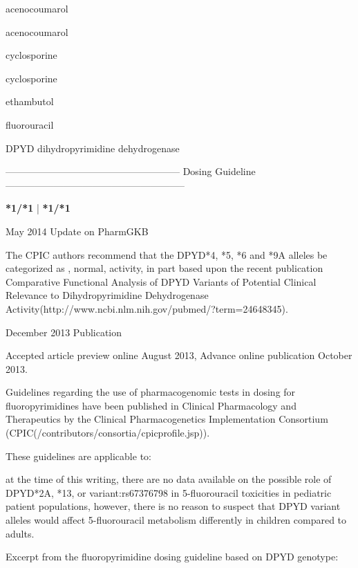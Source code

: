 \documentclass{resume} %
\begin{document}
\begin{rSection}{ acenocoumarol }
\begin{rSection}{ acenocoumarol }
\begin{rSection}{ cyclosporine }
\begin{rSection}{ cyclosporine }
\begin{rSection}{ ethambutol }
\end{rSection}\begin{rSection}{ fluorouracil }
\item[]
\begin{rSubsection}{ DPYD }{ dihydropyrimidine dehydrogenase }{}{}
\item[]
\item[] ------------------------------------------------------ Dosing Guideline --------------------------------------------------------\newline
\item[]
\item[] \textbf{ *1/*1 } | \textbf{ *1/*1 }
\item May 2014 Update on PharmGKB
 \newline
\item The CPIC authors recommend that the DPYD*4, *5, *6 and *9A alleles be categorized as , normal,  activity, in part based upon the recent publication Comparative Functional Analysis of DPYD Variants of Potential Clinical Relevance to Dihydropyrimidine Dehydrogenase Activity(http://www.ncbi.nlm.nih.gov/pubmed/?term=24648345). 
 \newline
\item December 2013 Publication
 \newline
\item Accepted article preview online August 2013,  Advance online publication October 2013.
 \newline
\item Guidelines regarding the use of pharmacogenomic tests in dosing for fluoropyrimidines have been published in Clinical Pharmacology and Therapeutics by the Clinical Pharmacogenetics Implementation Consortium (CPIC(/contributors/consortia/cpicprofile.jsp)).
 \newline
\item These guidelines are applicable to:
 \newline
\item at the time of this writing, there are no data available on the possible role of DPYD*2A, *13, or variant:rs67376798 in 5-fluorouracil toxicities in pediatric patient populations,  however, there is no reason to suspect that DPYD variant alleles would affect 5-fluorouracil metabolism differently in children compared to adults.
 \newline
\item Excerpt from the fluoropyrimidine dosing guideline based on DPYD genotype:
 \newline

\end{rSubsection}
\end{rSection}
\end{rSection}
\end{rSection}
\end{rSection}
\end{rSection}
\end{document}
